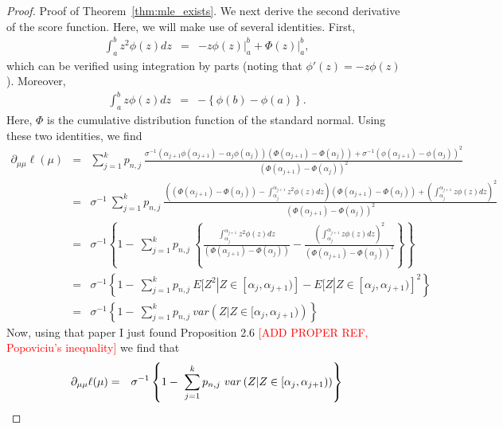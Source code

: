 \documentclass[12pt]{article} %
\begin{document}
\begin{proof}{Proof of Theorem~\ref{thm:mle_exists}.}
We next derive the second derivative of the score function.    Here, we will make use of several identities.   First,
\begin{eqnarray*}
\int_a^b z^2 \phi(z)dz &=& -z\phi(z) \vert_a^b + \Phi(z) \vert_a^b,
\end{eqnarray*}
which can be verified using integration by parts (noting that $\phi'(z)=-z\phi(z)$).  %
Moreover, 
\begin{eqnarray}\label{line:Gauss_ID1}
\int_{a}^{b}z\phi(z)dz &=& - \left\{ \phi(b)-\phi(a)\right\}.
\end{eqnarray}
Here, $\Phi$ is the cumulative distribution function of the standard normal.  Using these two identities, we find 
\begin{eqnarray*}
\partial_{\mu \mu} \ell(\mu) &=& \sum_{j=1}^k p_{n,j} \ \frac{\sigma^{-1}\left(\alpha_{j+1}\phi(\alpha_{j+1})-\alpha_{j}\phi(\alpha_{j})\right)\left(\Phi(\alpha_{j+1})-\Phi(\alpha_{j})\right)+\sigma^{-1}\left(\phi(\alpha_{j+1})-\phi(\alpha_{j})\right)^2}{\left(\Phi(\alpha_{j+1})-\Phi(\alpha_{j})\right)^2}\\
&=&\sigma^{-1} \ \sum_{j=1}^k p_{n,j} \ \frac{\left(\left(\Phi(\alpha_{j+1})-\Phi(\alpha_{j})\right)-\int_{\alpha_{j}}^{\alpha_{j+1}} z^2\phi(z) dz\right)\left(\Phi(\alpha_{j+1})-\Phi(\alpha_{j})\right)+\left(\int_{\alpha_{j}}^{\alpha_{j+1}} z\phi(z) dz\right)^2}{\left(\Phi(\alpha_{j+1})-\Phi(\alpha_{j})\right)^2}\\
&=&\sigma^{-1} \left\{1- \ \sum_{j=1}^k p_{n,j} \ \left\{\frac{\int_{\alpha_{j}}^{\alpha_{j+1}} z^2\phi(z) dz}{\left(\Phi(\alpha_{j+1})-\Phi(\alpha_{j})\right)}-\frac{\left(\int_{\alpha_{j}}^{\alpha_{j+1}} z\phi(z) dz\right)^2}{\left(\Phi(\alpha_{j+1})-\Phi(\alpha_{j})\right)^2}\right\}\right\}\\
&=& \sigma^{-1} \left\{1- \ \sum_{j=1}^k p_{n,j} \ E[Z^2|Z \in [\alpha_{j},\alpha_{j+1})]-E[Z|Z \in [\alpha_{j},\alpha_{j+1})]^2\right\}\\
&=& \sigma^{-1} \left\{1- \ \sum_{j=1}^k p_{n,j} \ var\left(Z\vert Z \in [\alpha_{j},\alpha_{j+1})\right)\right\}
\end{eqnarray*}
Now, using that paper I just found Proposition 2.6 \textcolor{red}{[ADD PROPER REF, Popoviciu's inequality]} we find that 
\begin{eqnarray}\label{line:pop}
\partial_{\mu \mu} \ell(\mu) &= &\sigma^{-1} \left\{1- \ \sum_{j=1}^k p_{n,j} \ var\left(Z\vert Z \in [\alpha_{j},\alpha_{j+1})\right)\right\}\notag\\

\end{eqnarray}
\end{proof}
\end{document}
